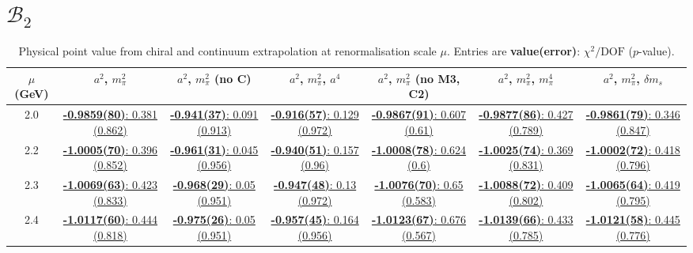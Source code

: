 \documentclass[12pt]{extarticle}
\begin{document}
\section{$\mathcal{B}_2$}
\begin{table}[h!]
\begin{center}
\begin{tabular}{|c|c|c|c|c|c|c|}
\hline
$\mu$ (GeV) & $a^2$, $m_\pi^2$& $a^2$, $m_\pi^2$ (no C)& $a^2$, $m_\pi^2$, $a^4$& $a^2$, $m_\pi^2$ (no M3, C2)& $a^2$, $m_\pi^2$, $m_\pi^4$& $a^2$, $m_\pi^2$, $\delta m_s$\\
\hline
2.0& \hyperlink{VVmAA/NPR/bag_a2m2_20.pdf.1}{\textbf{-0.9859(80)}: 0.381 (0.862)} & \hyperlink{VVmAA/NPR/bag_a2m2noC_20.pdf.1}{\textbf{-0.941(37)}: 0.091 (0.913)} & \hyperlink{VVmAA/NPR/bag_a2a4m2_20.pdf.1}{\textbf{-0.916(57)}: 0.129 (0.972)} & \hyperlink{VVmAA/NPR/bag_a2m2mcut_20.pdf.1}{\textbf{-0.9867(91)}: 0.607 (0.61)} & \hyperlink{VVmAA/NPR/bag_a2m2m4_20.pdf.1}{\textbf{-0.9877(86)}: 0.427 (0.789)} & \hyperlink{VVmAA/NPR/bag_a2m2delm_20.pdf.1}{\textbf{-0.9861(79)}: 0.346 (0.847)}\\
2.2& \hyperlink{VVmAA/NPR/bag_a2m2_22.pdf.1}{\textbf{-1.0005(70)}: 0.396 (0.852)} & \hyperlink{VVmAA/NPR/bag_a2m2noC_22.pdf.1}{\textbf{-0.961(31)}: 0.045 (0.956)} & \hyperlink{VVmAA/NPR/bag_a2a4m2_22.pdf.1}{\textbf{-0.940(51)}: 0.157 (0.96)} & \hyperlink{VVmAA/NPR/bag_a2m2mcut_22.pdf.1}{\textbf{-1.0008(78)}: 0.624 (0.6)} & \hyperlink{VVmAA/NPR/bag_a2m2m4_22.pdf.1}{\textbf{-1.0025(74)}: 0.369 (0.831)} & \hyperlink{VVmAA/NPR/bag_a2m2delm_22.pdf.1}{\textbf{-1.0002(72)}: 0.418 (0.796)}\\
2.3& \hyperlink{VVmAA/NPR/bag_a2m2_23.pdf.1}{\textbf{-1.0069(63)}: 0.423 (0.833)} & \hyperlink{VVmAA/NPR/bag_a2m2noC_23.pdf.1}{\textbf{-0.968(29)}: 0.05 (0.951)} & \hyperlink{VVmAA/NPR/bag_a2a4m2_23.pdf.1}{\textbf{-0.947(48)}: 0.13 (0.972)} & \hyperlink{VVmAA/NPR/bag_a2m2mcut_23.pdf.1}{\textbf{-1.0076(70)}: 0.65 (0.583)} & \hyperlink{VVmAA/NPR/bag_a2m2m4_23.pdf.1}{\textbf{-1.0088(72)}: 0.409 (0.802)} & \hyperlink{VVmAA/NPR/bag_a2m2delm_23.pdf.1}{\textbf{-1.0065(64)}: 0.419 (0.795)}\\
2.4& \hyperlink{VVmAA/NPR/bag_a2m2_24.pdf.1}{\textbf{-1.0117(60)}: 0.444 (0.818)} & \hyperlink{VVmAA/NPR/bag_a2m2noC_24.pdf.1}{\textbf{-0.975(26)}: 0.05 (0.951)} & \hyperlink{VVmAA/NPR/bag_a2a4m2_24.pdf.1}{\textbf{-0.957(45)}: 0.164 (0.956)} & \hyperlink{VVmAA/NPR/bag_a2m2mcut_24.pdf.1}{\textbf{-1.0123(67)}: 0.676 (0.567)} & \hyperlink{VVmAA/NPR/bag_a2m2m4_24.pdf.1}{\textbf{-1.0139(66)}: 0.433 (0.785)} & \hyperlink{VVmAA/NPR/bag_a2m2delm_24.pdf.1}{\textbf{-1.0121(58)}: 0.445 (0.776)}\\
\hline
\end{tabular}
\caption{Physical point value from chiral and continuum extrapolation at renormalisation scale $\mu$. Entries are \textbf{value(error)}: $\chi^2/\text{DOF}$ ($p$-value).}
\end{center}
\end{table}
\end{document}
